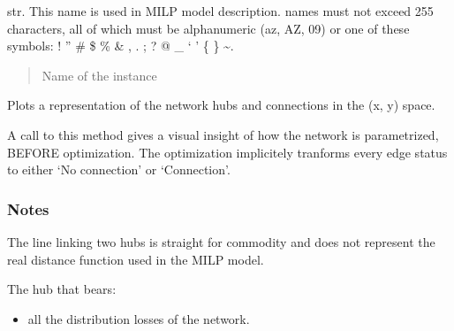 \documentclass[letterpaper,10pt,english]{sphinxmanual}
\begin{document}
\begin{fulllineitems}
\begin{fulllineitems}
\label{\detokenize{generated/tamos.network.HREThermalNetwork:tamos.network.HREThermalNetwork.name}}
\pysigstartsignatures
{}
\pysigstopsignatures
\sphinxAtStartPar
str.
This name is used in MILP model description.
names must not exceed 255 characters,
all of which must be alphanumeric (a\sphinxhyphen{}z, A\sphinxhyphen{}Z, 0\sphinxhyphen{}9) or one of these symbols:
! ” \# \$ \% \& , . ; ? @ \_ ‘ ’ \{ \} \textasciitilde{}.
\begin{quote}\begin{description}
\sphinxAtStartPar
Name of the instance

\end{description}\end{quote}

\end{fulllineitems}


\begin{fulllineitems}
\label{\detokenize{generated/tamos.network.HREThermalNetwork:tamos.network.HREThermalNetwork.plot}}
\pysigstartsignatures
{}
\pysigstopsignatures
\sphinxAtStartPar
Plots a representation of the network hubs and connections in the (x, y) space.

\sphinxAtStartPar
A call to this method gives a visual insight of how the network is parametrized, BEFORE optimization.
The optimization implicitely tranforms every edge status to either ‘No connection’ or ‘Connection’.
\subsubsection*{Notes}

\sphinxAtStartPar
The line linking two hubs is straight for commodity and does not represent
the real distance function used in the MILP model.

\end{fulllineitems}


\begin{fulllineitems}
\label{\detokenize{generated/tamos.network.HREThermalNetwork:tamos.network.HREThermalNetwork.production_hub}}
\pysigstartsignatures
{}
\pysigstopsignatures
\sphinxAtStartPar
The hub that bears:
\begin{itemize}
\item {} 
\sphinxAtStartPar
all the distribution losses of the network.


\end{itemize}
\end{fulllineitems}
\end{fulllineitems}
\end{document}
